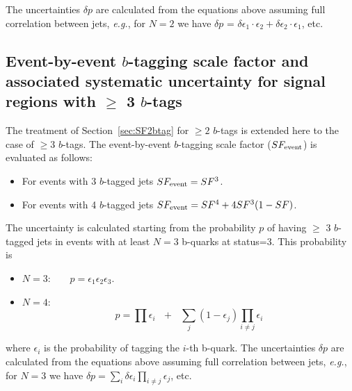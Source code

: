 The uncertainties $\delta p$ are calculated from the equations above assuming full 
correlation between jets, {\em e.g.}, for $N=2$ we have 
$\delta p$ = $\delta \epsilon_1 \cdot \epsilon_2 + \delta \epsilon_2 \cdot \epsilon_1$, etc.


\subsection{Event-by-event $b$-tagging scale factor and 
associated systematic uncertainty for signal regions with $\geq$ 3 $b$-tags}
\label{sec:SF3btag}
The treatment of Section~\ref{sec:SF2btag} for $\geq 2$ $b$-tags
is extended here to the case of $\geq 3$ $b$-tags.  
The event-by-event $b$-tagging scale factor ($SF_{\rm event}$) is evaluated
as follows:

\begin{itemize}
\item For events with 3 $b$-tagged jets $SF_{\rm event}=SF^3$.

\item For events with 4 $b$-tagged jets 
$SF_{\rm event}=SF^4 + 4SF^3(1-SF)$.

\end{itemize}

The uncertainty is calculated starting from the probability $p$ 
of having $\geq$ 3 $b$-tagged jets in events with at least $N=3$ b-quarks
at status=3.  This probability is

\begin{itemize}

\item $N = 3$:~~~~$p = \epsilon_1 \epsilon_2 \epsilon_3$.

\item $N = 4$:~~~~$$p = \prod{\epsilon_i}~~~+~~~\sum_j{(1-\epsilon_j)\prod_{i \ne j}{\epsilon_i}}$$

\end{itemize}

\noindent where $\epsilon_i$ is the probability of tagging the $i$-th b-quark.
The uncertainties $\delta p$ are calculated from the equations above assuming full 
correlation between jets, {\em e.g.}, for $N=3$ we have 
$\delta p = \sum_{i} \delta \epsilon_i \prod_{i \neq j} \epsilon_j$, etc.
